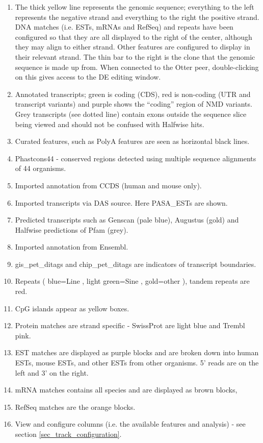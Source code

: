 \documentclass[letterpaper]{article}
\begin{document}
\begin{enumerate}
\item  The thick yellow line represents the genomic sequence; everything to the left represents the negative strand and everything to the right the positive strand. DNA matches (i.e. ESTs, mRNAs and RefSeq) and repeats have been configured so that they are all displayed to the right of the center, although they may align to either strand. Other features are configured to display in their relevant strand. The thin bar to the right is the clone that the genomic sequence is made up from. When connected to the Otter peer, double-clicking on this gives access to the DE editing window.
\item  Annotated transcripts; green is coding (CDS), red is non-coding (UTR and transcript variants) and purple shows the ``coding'' region of NMD variants. Grey transcripts (see dotted line) contain exons outside the sequence slice being viewed and should not be confused with Halfwise hits.
\item  Curated features, such as PolyA features are seen as horizontal black lines.
\item  Phastcons44 - conserved regions detected using multiple sequence alignments of 44 organisms.
\item  Imported annotation from CCDS (human and mouse only).
\item  Imported transcripts via DAS source. Here PASA\_ESTs are shown.
\item  Predicted transcripts such as Genscan (pale blue), Augustus (gold) and Halfwise predictions of Pfam (grey).
\item  Imported annotation from Ensembl.
\item  gis\_pet\_ditags and chip\_pet\_ditags are indicators of transcript boundaries.
\item Repeats ( blue=Line , light green=Sine , gold=other ), tandem repeats are red.
\item CpG islands appear as yellow boxes.
\item Protein matches are strand specific - SwissProt are light blue and Trembl pink.
\item EST matches are displayed as purple blocks and are broken down into human ESTs, mouse ESTs, and other ESTs from other organisms. 5' reads are on the left and 3' on the right.
\item mRNA matches contains all species and are displayed as brown blocks,
\item RefSeq matches are the orange blocks.
\item View and configure columns (i.e. the available features and analysis) - see section \ref{sec_track_configuration}.
\end{enumerate}
\end{document}
